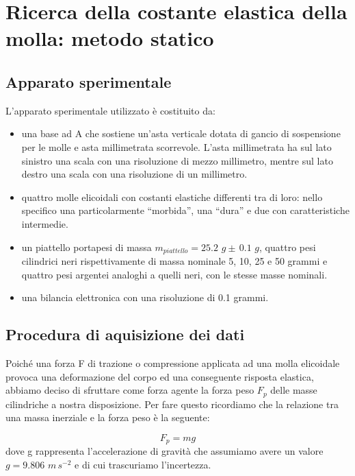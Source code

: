 \section{Ricerca della costante elastica della molla: metodo statico}

\subsection{Apparato sperimentale}
L'apparato sperimentale utilizzato è costituito da:
	\begin{itemize}
		\item{una base ad A che sostiene un'asta verticale dotata di gancio di sospensione
            per le molle e asta millimetrata scorrevole. L'asta millimetrata ha sul lato sinistro
            una scala con una risoluzione di mezzo millimetro, mentre sul lato destro una scala con
            una risoluzione di un millimetro.}
		\item{quattro molle elicoidali con costanti elastiche differenti tra di loro: nello specifico
            una particolarmente ``morbida'', una ``dura'' e due con caratteristiche intermedie.}
		\item{un piattello portapesi di massa $m_{piattello} = 25.2\,\,g \pm\, 0.1\,\,g$, quattro pesi
            cilindrici neri rispettivamente di massa nominale 5, 10, 25 e 50 grammi e quattro pesi argentei
            analoghi a quelli neri, con le stesse masse nominali.}
        \item{una bilancia elettronica con una risoluzione di 0.1 grammi.}
	\end{itemize}

\subsection{Procedura di aquisizione dei dati}

Poiché una forza F di trazione o compressione applicata ad una molla elicoidale provoca una deformazione del corpo ed una conseguente risposta elastica, abbiamo deciso di sfruttare come forza agente la forza peso $F_{p}$ delle masse cilindriche a nostra disposizione. Per fare questo ricordiamo che la relazione tra una massa inerziale e la forza peso è la seguente:

\begin{equation}
	F_{p} = mg
    \label{eq:fp}
\end{equation}
%
dove g rappresenta l'accelerazione di gravità che assumiamo avere un valore $g = 9.806\,\,m\,s^{-2}$ e di cui trascuriamo l'incertezza.

